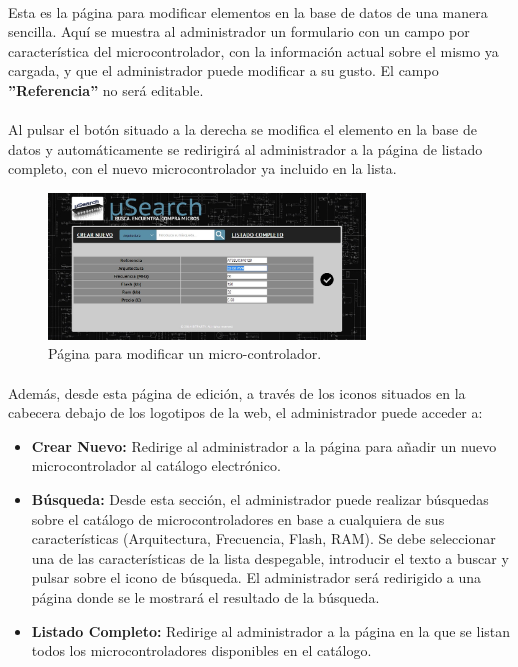 \paragraph{} Esta es la página para modificar elementos en la base de datos de una manera sencilla. Aquí se muestra al administrador un formulario con un campo por característica del microcontrolador, con la información actual sobre el mismo ya cargada, y que el administrador puede modificar a su gusto. El campo \textbf{''Referencia''} no será editable.

\paragraph{} Al pulsar el botón situado a la derecha se modifica el elemento en la base de datos y automáticamente se redirigirá al administrador a la página de listado completo, con el nuevo microcontrolador ya incluido en la lista.

\begin{figure}[h!]
	\centering
	\includegraphics[width=0.75\textwidth]{img/editar}
	\caption{Página para modificar un micro-controlador.}
	\label{fig:editar}
\end{figure}

\paragraph{}Además, desde esta página de edición, a través de los iconos situados en la cabecera debajo de los logotipos de la web, el administrador puede acceder a:

\begin{itemize}
	\item \textbf{Crear Nuevo:} Redirige al administrador a la página para añadir un nuevo microcontrolador al catálogo electrónico.

	\item \textbf{Búsqueda:} Desde esta sección, el administrador puede realizar búsquedas sobre el catálogo de microcontroladores en base a cualquiera de sus características (Arquitectura, Frecuencia, Flash, RAM). Se debe seleccionar una de las características de la lista despegable, introducir el texto a buscar y pulsar sobre el icono de búsqueda.
	El administrador será redirigido a una página donde se le mostrará el resultado de la búsqueda.
			
	\item \textbf{Listado Completo:} Redirige al administrador a la página en la que se listan todos los microcontroladores disponibles en el catálogo.
\end{itemize}